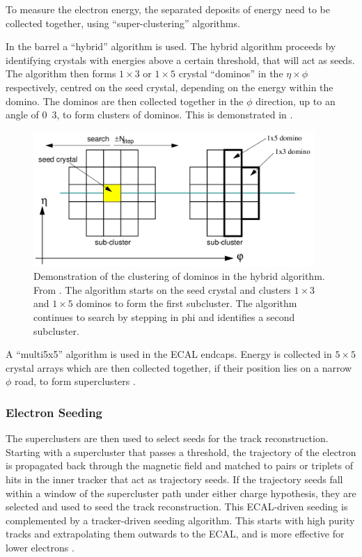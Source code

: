 To measure the electron energy, the separated deposits of energy need to be
collected together, using ``super-clustering'' algorithms. 

In the barrel a ``hybrid'' algorithm is used. The hybrid algorithm proceeds by
identifying crystals with energies above a certain threshold, that will act as
seeds. The algorithm then forms $1\times3$ or $1\times5$ crystal ``dominos'' in
the $\eta\times\phi$ respectively, centred on the seed crystal, depending on the
energy within the domino. The dominos are then collected together in the $\phi$
direction, up to an angle of \unit{0.3}{\rad}, to form clusters of dominos.
This is demonstrated in  \cite{meschi2001electron}.

\begin{figure}[htbp]
  \centering
  \includegraphics[width=0.95\textwidth]{hybridalgo}
  \caption{Demonstration of the clustering of dominos in the hybrid algorithm.
From \cite{meschi2001electron}. The algorithm starts on the seed crystal and clusters
$1\times3$ and $1\times5$ dominos to form the first subcluster. The algorithm continues to search
by stepping in phi and identifies a second subcluster.}
  \label{fig:hybrid}
\end{figure}

A ``multi5x5'' algorithm is used in the ECAL endcaps. Energy is collected in
$5\times5$ crystal arrays which are then collected together, if their position lies on
a narrow $\phi$ road, to form superclusters \cite{meschi2001electron}.

\subsubsection{Electron Seeding}
The superclusters are then used to select seeds for the track reconstruction.
Starting with a supercluster that passes a \pt threshold,
the trajectory of the electron is propagated back through the magnetic field and
matched to pairs or triplets of hits in the inner tracker that act as trajectory
seeds.  If the trajectory seeds fall within a window of the supercluster path
under either charge hypothesis, they are selected and used to seed the track
reconstruction.  This ECAL-driven seeding is complemented by a tracker-driven
seeding algorithm.  This starts with high purity tracks and extrapolating them
outwards to the ECAL, and is more effective for lower \pt electrons
\cite{baffioni2007electron,adam2009electron}.

